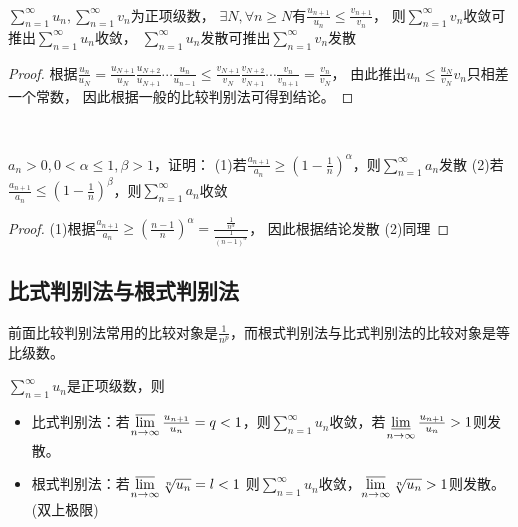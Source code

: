 ~

\begin{theorem}[比式比较判别法]
  $\sum\limits_{n = 1}^{\infty}u_n , \sum\limits_{n = 1}^{\infty}v_n$为正项级数，
  $\exists N, \forall n \geq N$有$\frac{u_{n+1}}{u_n} \leq \frac{v_{n+1}}{v_n}$，
  则$\sum\limits_{n = 1}^{\infty}v_n$收敛可推出$\sum\limits_{n = 1}^{\infty}u_n$收敛，
  $\sum\limits_{n = 1}^{\infty}u_n$发散可推出$\sum\limits_{n = 1}^{\infty}v_n$发散
\end{theorem}

\begin{proof}
  根据$\frac{u_n}{u_N} = \frac{u_{N+1}}{u_N} \frac{u_{N+2}}{u_{N+1}}\cdots \frac{u_n}{u_{n-1}} \leq \frac{v_{N+1}}{v_N} \frac{v_{N+2}}{v_{N+1}} \cdots \frac{v_n}{v_{n+1}} = \frac{v_n}{v_N}$，
  由此推出$u_n \leq \frac{u_N}{v_N}v_n$只相差一个常数，
  因此根据一般的比较判别法可得到结论。
\end{proof}

~

\begin{exercise}[比式比较判别法基本应用]
  $a_n > 0, 0 < \alpha \leq 1, \beta > 1$，证明：
  (1)若$\frac{a_{n+1}}{a_n} \geq (1 - \frac{1}{n})^{\alpha}$，则$\sum\limits_{n= 1}^{\infty}a_n$发散
  (2)若$\frac{a_{n+1}}{a_n} \leq (1 - \frac{1}{n})^{\beta}$，则$\sum\limits_{n = 1}^{\infty}a_n$收敛
\end{exercise}

\begin{proof}
  (1)根据$\frac{a_{n+1}}{a_n} \geq (\frac{n-1}{n})^{\alpha} = \frac{\frac{1}{n^{\alpha}}}{\frac{1}{(n-1)^{\alpha}}}$，
  因此根据结论发散
  (2)同理
\end{proof}


\subsection{比式判别法与根式判别法}

前面比较判别法常用的比较对象是$\frac{1}{n^p}$，而根式判别法与比式判别法的比较对象是等比级数。

\begin{theorem}[比式判别法与根式判别法]
  $\sum\limits_{n = 1}^{\infty}u_n$是正项级数，则
  \begin{itemize}
  \item 比式判别法：若$\varlimsup \limits _{n \rightarrow \infty} \frac{u_{n+1}}{u_n} = q < 1$，则$\sum\limits_{n = 1}^{\infty}u_n$收敛，若$\varliminf \limits _{n \rightarrow \infty} \frac{u_{n+1}}{u_n} > 1$则发散。
  \item 根式判别法：若$\varlimsup \limits _{n \rightarrow \infty} \sqrt[n]{u_n} = l < 1$
    则$\sum\limits_{n = 1}^{\infty}u_n$收敛，$\varlimsup \limits_{n \rightarrow \infty} \sqrt[n]{u_n} > 1$则发散。(双上极限)
  \end{itemize}
\end{theorem}

